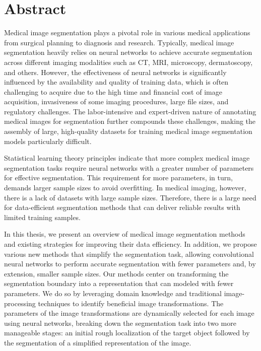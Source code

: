 \chapter{Abstract}

Medical image segmentation plays a pivotal role in various medical applications from surgical planning to diagnosis and research. Typically, medical image segmentation heavily relies on neural networks to achieve accurate segmentation across different imaging modalities such as CT, MRI, microscopy, dermatoscopy, and others. However, the effectiveness of neural networks is significantly influenced by the availability and quality of training data, which is often challenging to acquire due to the high time and financial cost of image acquisition, invasiveness of some imaging procedures, large file sizes, and regulatory challenges. The labor-intensive and expert-driven nature of annotating medical images for segmentation further compounds these challenges, making the assembly of large, high-quality datasets for training medical image segmentation models particularly difficult.

Statistical learning theory principles indicate that more complex medical image segmentation tasks require neural networks with a greater number of parameters for effective segmentation. This requirement for more parameters, in turn, demands larger sample sizes to avoid overfitting. In medical imaging, however, there is a lack of datasets with large sample sizes. Therefore, there is a large need for data-efficient segmentation methods that can deliver reliable results with limited training samples. 

In this thesis, we present an overview of medical image segmentation methods and existing strategies for improving their data efficiency. In addition, we propose various new methods that simplify the segmentation task, allowing convolutional neural networks to perform accurate segmentation with fewer parameters and, by extension, smaller sample sizes. Our methods center on transforming the segmentation boundary into a representation that can modeled with fewer parameters. We do so by leveraging domain knowledge and traditional image-processing techniques to identify beneficial image transformations. The parameters of the image transformations are dynamically selected for each image using neural networks, breaking down the segmentation task into two more manageable stages: an initial rough localization of the target object followed by the segmentation of a simplified representation of the image.


